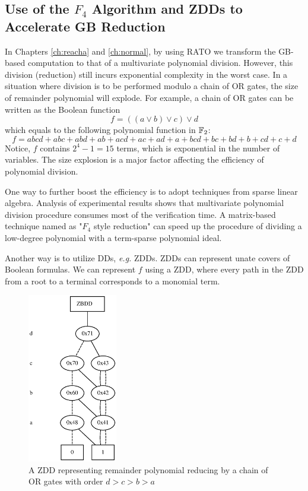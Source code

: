 \subsection{Use of the $F_4$ Algorithm and ZDDs to Accelerate GB Reduction}
In Chapters \ref{ch:reacha} and \ref{ch:normal}, by using RATO we transform the GB-based
computation to that of a multivariate polynomial division. However, this division (reduction)
still incurs exponential complexity in the worst case. In a situation where division is to be performed modulo
a chain of OR gates, the size of remainder polynomial will explode. For example, a chain of OR gates 
can be written as the Boolean function 
\begin{equation}
\label{eqn:chainOR}
f = ((a\lor b) \lor c) \lor d
\end{equation}
which equals to the following polynomial function in ${\mathbb{F}}_2$:
$$f = abcd+abc+abd+ab+acd+ac+ad+a+bcd+bc+bd+b+cd+c+d$$
Notice, $f$ contains $2^4-1 = 15$ terms, which is exponential in the number of variables.
The size explosion is a major factor affecting the efficiency of polynomial division.

One way to further boost the efficiency is to adopt techniques from sparse linear algebra.
Analysis of experimental results shows that multivariate polynomial division procedure
consumes most of the verification time.
A matrix-based technique named as "$F_4$ style reduction" \cite{f4} can speed up the procedure of
dividing a low-degree polynomial with a term-sparse polynomial ideal. 

Another way is to utilize DDs, {\it e.g.} ZDDs. ZDDs can represent unate covers of Boolean formulas.
We can represent $f$ using a ZDD, where every path in the ZDD from a root to a terminal corresponds
to a monomial term.

\begin{figure}[h]
\centerline{
\includegraphics[width=0.35\textwidth]{newfig/ZDD.eps}
}
\caption{A ZDD representing remainder polynomial reducing by a chain of OR gates with order $d>c>b>a$}
\label{fig:ZDD}
\end{figure}

